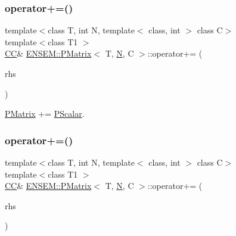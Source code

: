 \subsubsection{\texorpdfstring{operator+=()}{operator+=()}\hspace{0.1cm}{\footnotesize\ttfamily [4/6]}}
{\footnotesize\ttfamily template$<$class T, int N, template$<$ class, int $>$ class C$>$ \\
template$<$class T1 $>$ \\
\mbox{\hyperlink{classENSEM_1_1PMatrix_a744bac549029029effe32dc1705660ec}{CC}}\& \mbox{\hyperlink{classENSEM_1_1PMatrix}{E\+N\+S\+E\+M\+::\+P\+Matrix}}$<$ T, \mbox{\hyperlink{adat__devel_2lib_2hadron_2operator__name__util_8cc_a7722c8ecbb62d99aee7ce68b1752f337}{N}}, C $>$\+::operator+= (\begin{DoxyParamCaption}\item[{const \mbox{\hyperlink{classENSEM_1_1PScalar}{P\+Scalar}}$<$ T1 $>$ \&}]{rhs }\end{DoxyParamCaption})\hspace{0.3cm}{\ttfamily [inline]}}



\mbox{\hyperlink{classENSEM_1_1PMatrix}{P\+Matrix}} += \mbox{\hyperlink{classENSEM_1_1PScalar}{P\+Scalar}}. 

\mbox{\label{classENSEM_1_1PMatrix_a141db586d4797230e05d41ab13c12a1e}} 
\subsubsection{\texorpdfstring{operator+=()}{operator+=()}\hspace{0.1cm}{\footnotesize\ttfamily [5/6]}}
{\footnotesize\ttfamily template$<$class T, int N, template$<$ class, int $>$ class C$>$ \\
template$<$class T1 $>$ \\
\mbox{\hyperlink{classENSEM_1_1PMatrix_a744bac549029029effe32dc1705660ec}{CC}}\& \mbox{\hyperlink{classENSEM_1_1PMatrix}{E\+N\+S\+E\+M\+::\+P\+Matrix}}$<$ T, \mbox{\hyperlink{adat__devel_2lib_2hadron_2operator__name__util_8cc_a7722c8ecbb62d99aee7ce68b1752f337}{N}}, C $>$\+::operator+= (\begin{DoxyParamCaption}\item[{const \mbox{\hyperlink{classENSEM_1_1PScalar}{P\+Scalar}}$<$ T1 $>$ \&}]{rhs }\end{DoxyParamCaption})\hspace{0.3cm}{\ttfamily [inline]}}



